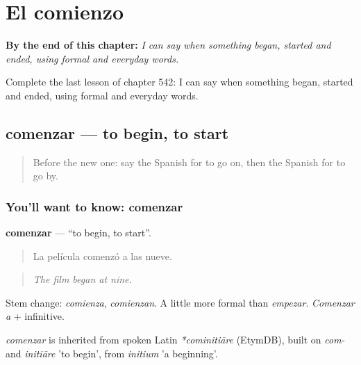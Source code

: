 
\chapter{El comienzo}
\label{ch:es-el-comienzo}

\begin{chapteropening}
\textbf{By the end of this chapter:} \emph{I can say when something began, started and ended, using formal and everyday words.}

Complete the last lesson of chapter 542: I can say when something began, started and ended, using formal and everyday words.
\end{chapteropening}

\section[comenzar]{comenzar — to begin, to start}

\label{lesson:ES-C542-comenzar}



\begin{quote}
Before the new one: say the Spanish for to go on, then the Spanish for to go by.
\end{quote}

\subsection*{You'll want to know: comenzar}
\textbf{comenzar} — \textquotedblleft{}to begin, to start\textquotedblright{}.

\begin{quote}
La película comenzó a las nueve.
\end{quote}

\begin{quote}
\emph{The film began at nine.}
\end{quote}

Stem change: \emph{comienza}, \emph{comienzan}. A little more formal than \emph{empezar}. \emph{Comenzar a} + infinitive.

\begin{cousinweb}
\emph{comenzar} is inherited from spoken Latin \emph{*cominitiāre} (EtymDB), built on \emph{com-} and \emph{initiāre} 'to begin', from \emph{initium} 'a beginning'.
\end{cousinweb}


